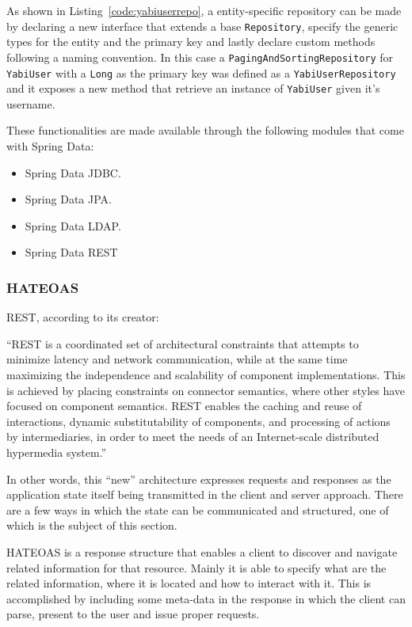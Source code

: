 As shown in Listing~\ref{code:yabiuserrepo}, a entity-specific repository can be made by declaring a new interface that extends a base \texttt{Repository}, specify the generic types for the entity and the primary key and lastly declare custom methods following a naming convention. In this case a \texttt{PagingAndSortingRepository} for \texttt{YabiUser} with a \texttt{Long} as the primary key was defined as a \texttt{YabiUserRepository} and it exposes a new method that retrieve an instance of \texttt{YabiUser} given it's username.



These functionalities are made available through the following modules that come with Spring Data:
\begin{itemize}
\item Spring Data \gls{JDBC}.
\item Spring Data \gls{JPA}.
\item Spring Data \gls{LDAP}.
\item Spring Data \gls{REST}
\end{itemize}

\subsubsection{\gls{HATEOAS}}
\gls{REST}, according to its creator:
\begin{displayquote}
  ``REST is a coordinated set of architectural constraints that attempts to minimize latency and network communication, while at the same time maximizing the independence and scalability of component implementations. This is achieved  by  placing  constraints  on  connector  semantics,  where  other  styles have focused on component semantics. REST enables the caching and reuse of interactions, dynamic substitutability of components, and processing of actions by intermediaries, in order to meet the needs of an Internet-scale distributed hypermedia system.''~\cite{fielding}
\end{displayquote}

In other words, this ``new'' architecture expresses requests and responses as the application state itself being transmitted in the client and server approach. There are a few ways in which the state can be communicated and structured, one of which is the subject of this section. 

\gls{HATEOAS} is a response structure that enables a client to discover and navigate related information for that resource\cite{fielding}. Mainly it is able to specify what are the related information, where it is located and how to interact with it. This is accomplished by including some meta-data in the response in which the client can parse, present to the user and issue proper requests.

